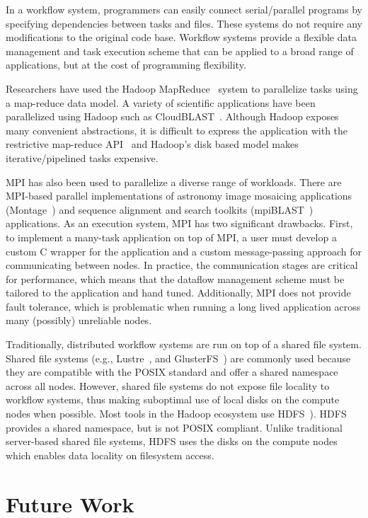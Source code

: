 \documentclass[conference]{IEEEtran}
\begin{document}
In a workflow system, programmers can easily connect serial/parallel programs by specifying
dependencies between tasks and files. These systems do not require any modifications to
the original code base. Workflow systems provide a flexible data management and task execution
scheme that can be applied to a broad range of applications, but at the cost of programming
flexibility.

Researchers have used the Hadoop MapReduce~\cite{HADOOP} system to parallelize
tasks using a map-reduce data model. A variety of scientific applications have been parallelized
using Hadoop such as CloudBLAST~\cite{matsunaga08}. 
Although Hadoop exposes many convenient abstractions, it is difficult to express the application 
with the restrictive map-reduce API~\cite{dewitt08} and Hadoop's disk based model makes 
iterative/pipelined tasks expensive.

MPI has also been used to parallelize a diverse range of workloads. There
are MPI-based parallel implementations of astronomy image
mosaicing applications (Montage~\cite{jacob09}) and
sequence alignment and search toolkits (mpiBLAST~\cite{lin08}) applications. As an
execution system, MPI has two significant drawbacks. First, to implement a many-task
application on top of MPI, a user must develop a custom C wrapper for the application
and a custom message-passing approach for communicating between nodes. In practice, the
communication stages are critical for performance, which means that the
dataflow management scheme must be tailored to the application and hand tuned. Additionally,
MPI does not provide fault tolerance, which is problematic when running a long lived
application across many (possibly) unreliable nodes.

Traditionally, distributed workflow systems are run on top of a shared file system. 
Shared file systems (e.g., Lustre~\cite{donovan03}, and
GlusterFS~\cite{davies13}) are commonly used because they are compatible with the POSIX
standard and offer a shared namespace across all nodes. However, shared file systems
do not expose file locality to workflow systems, thus making suboptimal use of local
disks on the compute nodes when possible. Most tools in the Hadoop ecosystem use
HDFS~\cite{shvachko10}). HDFS  provides a shared namespace, but is not POSIX
compliant. Unlike traditional server-based shared file systems, HDFS uses
the disks on the compute nodes which enables data locality on filesystem access.

\section{Future Work}
\label{sec:Future}
\end{document}
